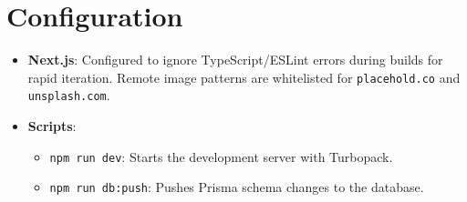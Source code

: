 \documentclass{article}
\begin{document}
\section{Configuration}
\begin{itemize}
    \item \textbf{Next.js}: Configured to ignore TypeScript/ESLint errors during builds for rapid iteration. Remote image patterns are whitelisted for \texttt{placehold.co} and \texttt{unsplash.com}.
    \item \textbf{Scripts}:
    \begin{itemize}
        \item \texttt{npm run dev}: Starts the development server with Turbopack.
        \item \texttt{npm run db:push}: Pushes Prisma schema changes to the database.
    \end{itemize}
\end{itemize}
\end{document}
